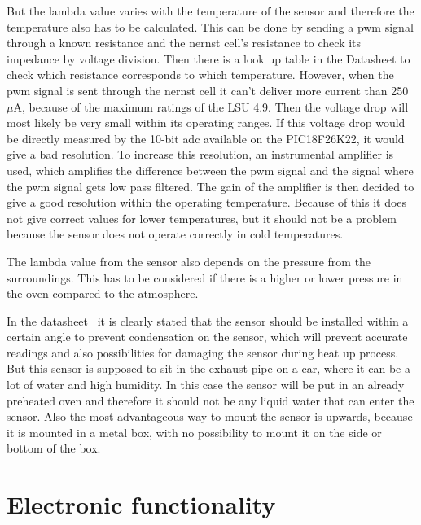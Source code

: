 But the lambda value varies with the temperature of the sensor and therefore the temperature also has to be calculated. This can be done by sending a \ac{pwm} signal through a known resistance and the nernst cell's resistance to check its impedance by voltage division. Then there is a look up table in the Datasheet \cite{LSU49} to check which resistance corresponds to which temperature. However, when the \ac{pwm} signal is sent through the nernst cell it can't deliver more current than 250 $\mu$A, because of the maximum ratings of the LSU 4.9. Then the voltage drop will most likely be very small within its operating ranges. If this voltage drop would be directly measured by the 10-bit \ac{adc} available on the PIC18F26K22, it would give a bad resolution. To increase this resolution, an instrumental amplifier is used, which amplifies the difference between the \ac{pwm} signal and the signal where the \ac{pwm} signal gets low pass filtered. The gain of the amplifier is then decided to give a good resolution within the operating temperature. Because of this it does not give correct values for lower temperatures, but it should not be a problem because the sensor does not operate correctly in cold temperatures.

The lambda value from the sensor also depends on the pressure from the surroundings. This has to be considered if there is a higher or lower pressure in the oven compared to the atmosphere.

In the datasheet~\cite{LSU49} it is clearly stated that the sensor should be installed within a certain angle to prevent condensation on the sensor, which will prevent accurate readings and also possibilities for damaging the sensor during heat up process. But this sensor is supposed to sit in the exhaust pipe on a car, where it can be a lot of water and high humidity. In this case the sensor will be put in an already preheated oven and therefore it should not be any liquid water that can enter the sensor. Also the most advantageous way to mount the sensor is upwards, because it is mounted in a metal box, with no possibility to mount it on the side or bottom of the box.



\section{Electronic functionality}

